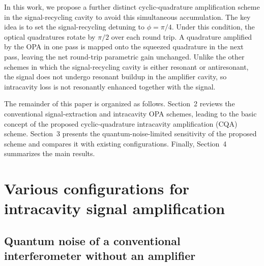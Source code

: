 \documentclass{iopjournal}
\begin{document}
In this work, we propose a further distinct cyclic-quadrature amplification scheme in the signal-recycling cavity to avoid this simultaneous accumulation. 
The key idea is to set the signal-recycling detuning to $\phi=\pi/4$. 
Under this condition, the optical quadratures rotate by $\pi/2$ over each round trip. 
A quadrature amplified by the OPA in one pass is mapped onto the squeezed quadrature in the next pass, leaving the net round-trip parametric gain unchanged. 
Unlike the other schemes in which the signal-recycling cavity is either resonant or antiresonant, the signal does not undergo resonant buildup in the amplifier cavity, so intracavity loss is not resonantly enhanced together with the signal.

The remainder of this paper is organized as follows. Section~2 reviews the conventional signal-extraction and intracavity OPA schemes, leading to the basic concept of the proposed cyclic-quadrature intracavity amplification (CQA) scheme. Section~3 presents the quantum-noise-limited sensitivity of the proposed scheme and compares it with existing configurations. Finally, Section~4 summarizes the main results.



\section{Various configurations for intracavity signal amplification}\label{sec:concept}
\subsection{Quantum noise of a conventional interferometer without an amplifier}
\end{document}
